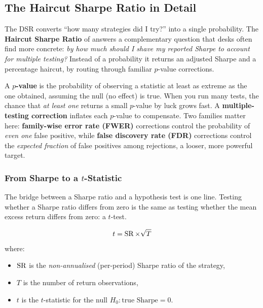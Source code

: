 \subsection{The Haircut Sharpe Ratio in Detail}
\label{sec:eval-haircut-detail}

The DSR converts ``how many strategies did I try?'' into a single probability.
The \textbf{Haircut Sharpe Ratio} of \citet{HarveyLiu2015} answers a complementary question that desks often find more concrete: \emph{by how much should I shave my reported Sharpe to account for multiple testing?}
Instead of a probability it returns an adjusted Sharpe and a percentage haircut, by routing through familiar $p$-value corrections.

\begin{prereq}
A \textbf{$p$-value} is the probability of observing a statistic at least as extreme as the one obtained, assuming the null (no effect) is true.
When you run many tests, the chance that \emph{at least one} returns a small $p$-value by luck grows fast.
A \textbf{multiple-testing correction} inflates each $p$-value to compensate.
Two families matter here: \textbf{family-wise error rate (FWER)} corrections control the probability of \emph{even one} false positive, while \textbf{false discovery rate (FDR)} corrections control the \emph{expected fraction} of false positives among rejections, a looser, more powerful target.
\end{prereq}

\subsubsection{From Sharpe to a $t$-Statistic}

The bridge between a Sharpe ratio and a hypothesis test is one line.
Testing whether a Sharpe ratio differs from zero is the same as testing whether the mean excess return differs from zero: a $t$-test.

\begin{equation}
\label{eq:eval-sr-to-t}
t = \operatorname{SR} \times \sqrt{T}
\end{equation}
where:
\begin{itemize}[nosep]
  \item $\operatorname{SR}$ is the \emph{non-annualised} (per-period) Sharpe ratio of the strategy,
  \item $T$ is the number of return observations,
  \item $t$ is the $t$-statistic for the null $H_0: \text{true Sharpe} = 0$.
\end{itemize}

